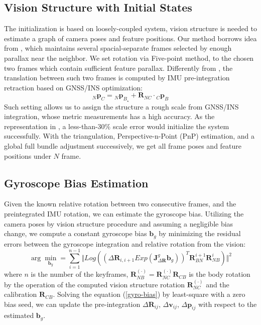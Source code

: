 \documentclass[journal,article,submit,moreauthors,pdftex]{Definitions/mdpi}
\begin{document}
\subsection{Vision Structure with Initial States}
The initialization is based on loosely-coupled system, vision structure is needed to estimate a graph of camera poses and feature positions. Our method borrows idea from \cite{qinRobustInitializationMonocular2017}, which maintains several
spacial-separate frames selected by enough parallax near the neighbor. We set rotation via Five-point method, to the chosen two frames which contain sufficient feature parallax. Differently from \cite{qinRobustInitializationMonocular2017}, the translation between such two frames is computed by IMU pre-integration retraction \cite{dellaertFactorGraphsRobot2017} based on GNSS/INS optimization:
\begin{equation}
	{_N}\boldsymbol{p}_{C} = {_N}\boldsymbol{p}_{B_{\star}} + \boldsymbol{R}_{NC}\cdot{_C}\boldsymbol{p}_{B}
	\label{tranB-transC}
\end{equation} 
Such setting allows us to assign the structure a rough scale from GNSS/INS integration, whose metric measurements has a high accuracy. As the representation in \cite{qinRobustInitializationMonocular2017}, a less-than-$30\%$ scale error would initialize the system successfully. With the triangulation, Perspective-n-Point (PnP) estimation, and a global full bundle adjustment successively, we get all frame poses and feature positions under $N$ frame.

\subsection{Gyroscope Bias Estimation}
Given the known relative rotation between two consecutive frames, and the preintegrated IMU rotation, we can estimate the gyroscope bias. Utilizing the camera poses by vision structure procedure and assuming a negligible bias change, we compute a constant gyroscope bias $\boldsymbol{b}_g$ by minimizing the residual errors between the gyroscope integration and relative rotation from the vision: 
\begin{equation}
	\arg \min \limits_{\boldsymbol{b}_g} = \sum_{i=1}^{n-1}\Vert Log \left( (\Delta{\boldsymbol{R}_{i,i+1}}Exp(\boldsymbol{J}_{\Delta{\boldsymbol{R}}}^g\boldsymbol{b}_g))^T \boldsymbol{R}_{BN}^{i+1}\boldsymbol{R}_{NB}^{i}  \right) \Vert^2
	\label{gyro-bias}
\end{equation}
where $n$ is the number of the keyframes, $\boldsymbol{R}_{NB}^{(\cdot)} = \boldsymbol{R}_{NC}^{(\cdot)}\boldsymbol{R}_{CB} $ is the body rotation by the operation of the computed vision structure rotation $\boldsymbol{R}_{NC}^{(\cdot)}$ and the calibration $\boldsymbol{R}_{CB}$. Solving the equation (\ref{gyro-bias}) by least-square with a zero bias seed, we can update the pre-integration $\Delta{\boldsymbol{R}_{ij}}$, $\Delta{\boldsymbol{v}_{ij}}$, $\Delta{\boldsymbol{p}_{ij}}$ with respect to the estimated $\boldsymbol{b}_g$. 
\end{document}
